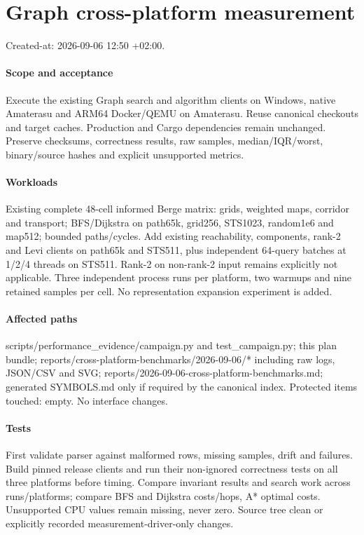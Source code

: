 \documentclass{article}
\begin{document}
\section*{Graph cross-platform measurement}
Created-at: 2026-09-06 12:50 +02:00.

\paragraph{Scope and acceptance} Execute the existing Graph search and algorithm clients on Windows, native Amaterasu and ARM64 Docker/QEMU on Amaterasu. Reuse canonical checkouts and target caches. Production and Cargo dependencies remain unchanged. Preserve checksums, correctness results, raw samples, median/IQR/worst, binary/source hashes and explicit unsupported metrics.
\paragraph{Workloads} Existing complete 48-cell informed Berge matrix: grids, weighted maps, corridor and transport; BFS/Dijkstra on path65k, grid256, STS1023, random1e6 and map512; bounded paths/cycles. Add existing reachability, components, rank-2 and Levi clients on path65k and STS511, plus independent 64-query batches at 1/2/4 threads on STS511. Rank-2 on non-rank-2 input remains explicitly not applicable. Three independent process runs per platform, two warmups and nine retained samples per cell. No representation expansion experiment is added.
\paragraph{Affected paths} scripts/performance\_evidence/campaign.py and test\_campaign.py; this plan bundle; reports/cross-platform-benchmarks/2026-09-06/* including raw logs, JSON/CSV and SVG; reports/2026-09-06-cross-platform-benchmarks.md; generated SYMBOLS.md only if required by the canonical index. Protected items touched: empty. No interface changes.
\paragraph{Tests} First validate parser against malformed rows, missing samples, drift and failures. Build pinned release clients and run their non-ignored correctness tests on all three platforms before timing. Compare invariant results and search work across runs/platforms; compare BFS and Dijkstra costs/hops, A* optimal costs. Unsupported CPU values remain missing, never zero. Source tree clean or explicitly recorded measurement-driver-only changes.
\end{document}
